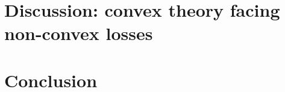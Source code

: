 \documentclass[11pt,a4paper]{article}
\begin{document}
\section{Discussion: convex theory facing non-convex losses}

\section{Conclusion}



\end{document}
